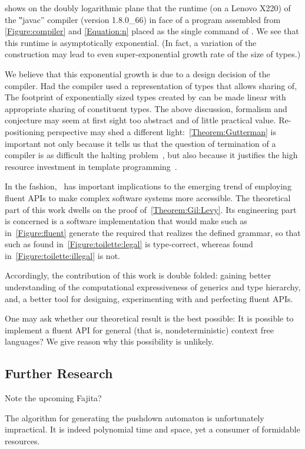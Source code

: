  shows on the doubly logarithmic plane that the runtime (on a Lenovo X220)
  of the ‟javac” compiler (version 1.8.0\_66) in face of a \Java program
  assembled from \cref{Figure:compiler} and \cref{Equation:n} placed as the
  single command of .
We see that this runtime is asymptotically exponential.
(In fact, a variation of the construction may lead to even super-exponential growth rate of the size of types.)

We believe that this exponential growth is due to a design decision of the compiler.
Had the compiler used a representation of types that allows sharing of,
The footprint of exponentially sized types created by can be made linear
  with appropriate sharing of constituent types.
The above discussion, formalism and conjecture may seem at first sight too abstract
  and of little practical value.
Re-positioning perspective may shed a different light:~\cref{Theorem:Gutterman} is important not only because it tells us
  that the question of termination of a \CC compiler is as difficult
  the halting problem~\cite{Turing:1936}, but also because it
  justifies the high resource investment in
  template programming~\cite{Musser:Stepanov:1989,Dehnert:Stepanov:2000
  ,Backhouse:Jansson:1999, Austern:1998,Bracha:Odersky:Stoutamire:Wadler:98,X:Garcia:Jarvi:Lumsdaine:Siek:Willcock:03}.

In the fashion,~ has important
  implications to the emerging trend of employing fluent APIs
  to make complex software systems more accessible.
The theoretical part of this work dwells on the proof of~\cref{Theorem:Gil:Levy}.
Its engineering part is concerned is
  a software implementation that would make \Java
  such as in~\cref{Figure:fluent} generate
  the required \Java that realizes the
  defined grammar, so that \Java such as
  found in~\cref{Figure:toilette:legal} is type-correct,
  whereas \Java found in~\cref{Figure:toilette:illegal} is not.

Accordingly, the contribution of this work is double folded:
  gaining better understanding of the computational expressiveness of
  \Java generics and type hierarchy, and, a better tool
  for designing, experimenting with and perfecting fluent APIs.

One may ask whether our theoretical result is the
  best possible:
It is possible to implement a fluent API for general
  (that is, nondeterministic) context free languages?
  We give reason why this possibility is unlikely.

\subsection{Further Research}
Note the upcoming \textsf{Fajita}?

The algorithm for generating the pushdown automaton is unfortunately impractical.
It is indeed polynomial time and space,
  yet a consumer of formidable resources.
